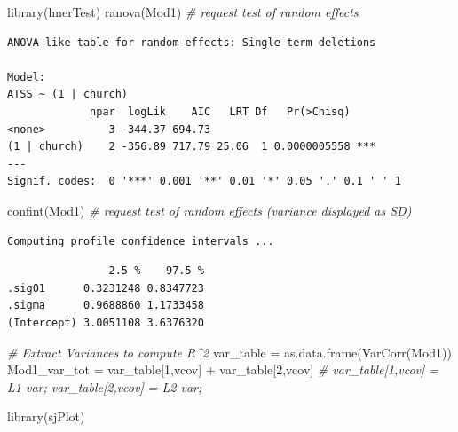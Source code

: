 \documentclass[
  11pt,
]{book}
\newenvironment{Shaded}{\begin{snugshade}}{\end{snugshade}}
\newcommand{\CommentTok}[1]{\textcolor[rgb]{0.56,0.35,0.01}{\textit{#1}}}
\newcommand{\DecValTok}[1]{\textcolor[rgb]{0.00,0.00,0.81}{#1}}
\newcommand{\FunctionTok}[1]{\textcolor[rgb]{0.00,0.00,0.00}{#1}}
\newcommand{\NormalTok}[1]{#1}
\newcommand{\OtherTok}[1]{\textcolor[rgb]{0.56,0.35,0.01}{#1}}
\newcommand{\SpecialCharTok}[1]{\textcolor[rgb]{0.00,0.00,0.00}{#1}}
\newcommand{\StringTok}[1]{\textcolor[rgb]{0.31,0.60,0.02}{#1}}
\begin{document}
\begin{Shaded}
\begin{Highlighting}[]
\FunctionTok{library}\NormalTok{(lmerTest)}
\FunctionTok{ranova}\NormalTok{(Mod1) }\CommentTok{\# request test of random effects}
\end{Highlighting}
\end{Shaded}

\begin{verbatim}
ANOVA-like table for random-effects: Single term deletions

Model:
ATSS ~ (1 | church)
             npar  logLik    AIC   LRT Df   Pr(>Chisq)    
<none>          3 -344.37 694.73                          
(1 | church)    2 -356.89 717.79 25.06  1 0.0000005558 ***
---
Signif. codes:  0 '***' 0.001 '**' 0.01 '*' 0.05 '.' 0.1 ' ' 1
\end{verbatim}

\begin{Shaded}
\begin{Highlighting}[]
\FunctionTok{confint}\NormalTok{(Mod1) }\CommentTok{\# request test of random effects (variance displayed as SD)}
\end{Highlighting}
\end{Shaded}

\begin{verbatim}
Computing profile confidence intervals ...
\end{verbatim}

\begin{verbatim}
                2.5 %    97.5 %
.sig01      0.3231248 0.8347723
.sigma      0.9688860 1.1733458
(Intercept) 3.0051108 3.6376320
\end{verbatim}

\begin{Shaded}
\begin{Highlighting}[]
\CommentTok{\# Extract Variances to compute R\^{}2}
\NormalTok{  var\_table }\OtherTok{=} \FunctionTok{as.data.frame}\NormalTok{(}\FunctionTok{VarCorr}\NormalTok{(Mod1))}
\NormalTok{  Mod1\_var\_tot }\OtherTok{=}\NormalTok{ var\_table[}\DecValTok{1}\NormalTok{,}\StringTok{\textquotesingle{}vcov\textquotesingle{}}\NormalTok{] }\SpecialCharTok{+}\NormalTok{ var\_table[}\DecValTok{2}\NormalTok{,}\StringTok{\textquotesingle{}vcov\textquotesingle{}}\NormalTok{] }\CommentTok{\# var\_table[1,\textquotesingle{}vcov\textquotesingle{}] = L1 var; var\_table[2,\textquotesingle{}vcov\textquotesingle{}] = L2 var;  }

\FunctionTok{library}\NormalTok{(sjPlot)}
\end{Highlighting}
\end{Shaded}
\end{document}
